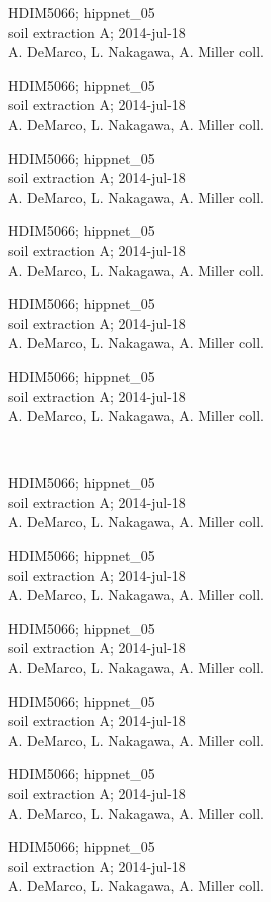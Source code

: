 \documentclass[2pt]{extarticle}
\begin{document}
\noindent
\parbox{0.16\textwidth}{\tiny \raggedright \rule[-0.3\baselineskip]{0pt}{10pt}HDIM5066; hippnet\_05\\ soil extraction A; 2014-jul-18\\ A. DeMarco, L. Nakagawa, A. Miller coll.}
\parbox{0.16\textwidth}{\tiny \raggedright \rule[-0.3\baselineskip]{0pt}{10pt}HDIM5066; hippnet\_05\\ soil extraction A; 2014-jul-18\\ A. DeMarco, L. Nakagawa, A. Miller coll.}
\parbox{0.16\textwidth}{\tiny \raggedright \rule[-0.3\baselineskip]{0pt}{10pt}HDIM5066; hippnet\_05\\ soil extraction A; 2014-jul-18\\ A. DeMarco, L. Nakagawa, A. Miller coll.}
\parbox{0.16\textwidth}{\tiny \raggedright \rule[-0.3\baselineskip]{0pt}{10pt}HDIM5066; hippnet\_05\\ soil extraction A; 2014-jul-18\\ A. DeMarco, L. Nakagawa, A. Miller coll.}
\parbox{0.16\textwidth}{\tiny \raggedright \rule[-0.3\baselineskip]{0pt}{10pt}HDIM5066; hippnet\_05\\ soil extraction A; 2014-jul-18\\ A. DeMarco, L. Nakagawa, A. Miller coll.}
\parbox{0.16\textwidth}{\tiny \raggedright \rule[-0.3\baselineskip]{0pt}{10pt}HDIM5066; hippnet\_05\\ soil extraction A; 2014-jul-18\\ A. DeMarco, L. Nakagawa, A. Miller coll.} \\ 
\vspace{0.001in} 

\noindent
\parbox{0.16\textwidth}{\tiny \raggedright \rule[-0.3\baselineskip]{0pt}{10pt}HDIM5066; hippnet\_05\\ soil extraction A; 2014-jul-18\\ A. DeMarco, L. Nakagawa, A. Miller coll.}
\parbox{0.16\textwidth}{\tiny \raggedright \rule[-0.3\baselineskip]{0pt}{10pt}HDIM5066; hippnet\_05\\ soil extraction A; 2014-jul-18\\ A. DeMarco, L. Nakagawa, A. Miller coll.}
\parbox{0.16\textwidth}{\tiny \raggedright \rule[-0.3\baselineskip]{0pt}{10pt}HDIM5066; hippnet\_05\\ soil extraction A; 2014-jul-18\\ A. DeMarco, L. Nakagawa, A. Miller coll.}
\parbox{0.16\textwidth}{\tiny \raggedright \rule[-0.3\baselineskip]{0pt}{10pt}HDIM5066; hippnet\_05\\ soil extraction A; 2014-jul-18\\ A. DeMarco, L. Nakagawa, A. Miller coll.}
\parbox{0.16\textwidth}{\tiny \raggedright \rule[-0.3\baselineskip]{0pt}{10pt}HDIM5066; hippnet\_05\\ soil extraction A; 2014-jul-18\\ A. DeMarco, L. Nakagawa, A. Miller coll.}
\parbox{0.16\textwidth}{\tiny \raggedright \rule[-0.3\baselineskip]{0pt}{10pt}HDIM5066; hippnet\_05\\ soil extraction A; 2014-jul-18\\ A. DeMarco, L. Nakagawa, A. Miller coll.} \\ 
\vspace{0.001in} 
\end{document}
